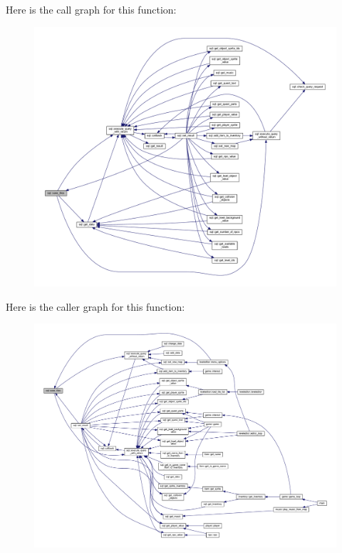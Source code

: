 Here is the call graph for this function\+:
\nopagebreak
\begin{figure}[H]
\begin{center}
\leavevmode
\includegraphics[width=350pt]{classsql_a4c6195e2934d72569b45041039a2be63_cgraph}
\end{center}
\end{figure}
Here is the caller graph for this function\+:
\nopagebreak
\begin{figure}[H]
\begin{center}
\leavevmode
\includegraphics[width=350pt]{classsql_a4c6195e2934d72569b45041039a2be63_icgraph}
\end{center}
\end{figure}
\mbox{\label{classsql_ac24a3682f7478f78508e3e433b637407}} 
